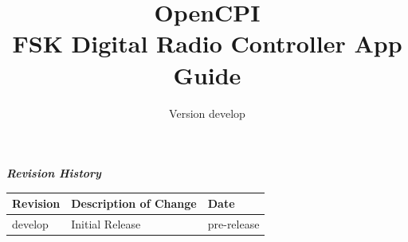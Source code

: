 \def\docTitle{OpenCPI\\ FSK Digital Radio Controller App Guide}
\def\docVersion{\color{red}develop} %
\def\snippetpath{../../../../../doc/av/tex/snippets}


\date{Version \docVersion} %
\title{\docTitle}
\usepackage{graphicx}
\graphicspath{ {figures/} }
\usepackage{textcomp}
\usepackage{listings}


\maketitle

\begin{center}
  \textit{\textbf{Revision History}}
  \begin{longtable}{|p{}
                    |p{}
                    |p{}|}
    \hline
    \rowcolor{blue}
    \textbf{Revision} & \textbf{Description of Change} & \textbf{Date} \\
    \hline
    \docVersion & Initial Release & \color{red}pre-release \\
    \hline
  \end{longtable}
\end{center}

